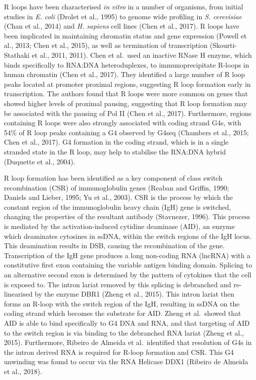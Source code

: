 \documentclass[12pt,a4paper,]{report}
\begin{document}
R loops have been characterised \emph{in vitro} in a number of
organisms, from initial studies in \emph{E. coli} (Drolet et al., 1995)
to genome wide profiling in \emph{S. cerevisiae} (Chan et al., 2014) and
\emph{H. sapiens} cell lines (Chen et al., 2017). R loops have been
implicated in maintaining chromatin status and gene expression (Powell
et al., 2013; Chen et al., 2015), as well as termination of
transcription (Skourti-Stathaki et al., 2011, 2011). Chen et al.~used an
inactive RNase H enzyme, which binds specifically to RNA:DNA
heteroduplexes, to immunoprecipitate R-loops in human chromatin (Chen et
al., 2017). They identified a large number of R loop peaks located at
promoter proximal regions, suggesting R loop formation early in
transcription. The authors found that R loops were more common on genes
that showed higher levels of proximal pausing, suggesting that R loop
formation may be associated with the pausing of Pol II (Chen et al.,
2017). Furthermore, regions containing R loops were also strongly
associated with coding strand G4s, with 54\% of R loop peaks containing
a G4 observed by G4seq (Chambers et al., 2015; Chen et al., 2017). G4
formation in the coding strand, which is in a single stranded state in
the R loop, may help to stabilise the RNA:DNA hybrid (Duquette et al.,
2004).

R loop formation has been identified as a key component of class switch
recombination (CSR) of immunoglobulin genes (Reaban and Griffin, 1990;
Daniels and Lieber, 1995; Yu et al., 2003). CSR is the process by which
the constant region of the immunoglobulin heavy chain (IgH) gene is
switched, changing the properties of the resultant antibody (Stavnezer,
1996). This process is mediated by the activation-induced cytidine
deaminase (AID), an enzyme which deaminates cytosines in ssDNA, within
the switch regions of the IgH locus. This deamination results in DSB,
causing the recombination of the gene. Transcription of the IgH gene
produces a long non-coding RNA (lncRNA) with a constitutive first exon
containing the variable antigen binding domain. Splicing to an
alternative second exon is determined by the pattern of cytokines that
the cell is exposed to. The intron lariat removed by this splicing is
debranched and re-linearised by the enzyme DBR1 (Zheng et al., 2015).
This intron lariat then forms an R-loop with the switch region of the
IgH, resulting in ssDNA on the coding strand which becomes the substrate
for AID. Zheng et al.~showed that AID is able to bind specifically to G4
DNA and RNA, and that targeting of AID to the switch region is via
binding to the debranched RNA lariat (Zheng et al., 2015). Furthermore,
Ribeiro de Almeida et al.~identified that resolution of G4s in the
intron derived RNA is required for R-loop formation and CSR. This G4
unwinding was found to occur via the RNA Helicase DDX1 (Ribeiro de
Almeida et al., 2018).
\end{document}
